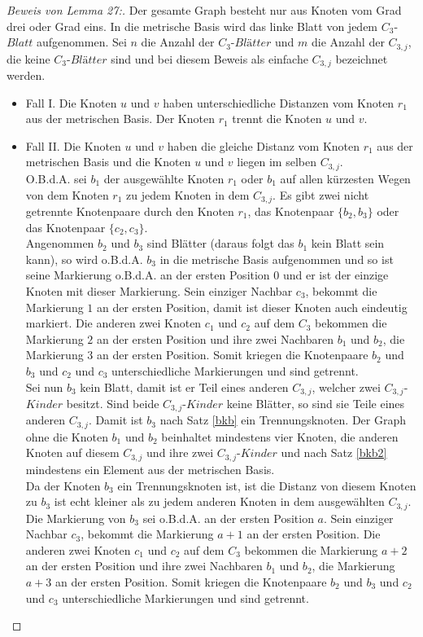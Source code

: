 \begin{proof}[Beweis von Lemma 27:]
Der gesamte Graph besteht nur aus Knoten vom Grad drei oder Grad eins. In die metrische Basis wird das linke Blatt von jedem $C_{3}$-$Blatt$ aufgenommen. Sei $n$ die Anzahl der $C_{3}$-$Blätter$ und $m$ die Anzahl der $C_{3,j}$, die keine $C_{3}$-$Blätter$ sind und bei diesem Beweis als einfache $C_{3,j}$ bezeichnet werden.
\begin{itemize}
\item Fall I. Die Knoten $u$ und $v$ haben unterschiedliche Distanzen vom Knoten $r_1$ aus der metrischen Basis. Der Knoten $r_1$ trennt die Knoten $u$ und $v$.
\item Fall II. Die Knoten $u$ und $v$ haben die gleiche Distanz vom Knoten $r_1$ aus der metrischen Basis und die Knoten $u$ und $v$ liegen im selben $C_{3,j}$.\\
O.B.d.A. sei $b_1$ der ausgewählte Knoten $r_1$ oder $b_1$ auf allen kürzesten Wegen von dem Knoten $r_1$ zu jedem Knoten in dem $C_{3,j}$. Es gibt zwei nicht getrennte Knotenpaare durch den Knoten $r_1$, das Knotenpaar $\{b_2,b_3\}$ oder das Knotenpaar $\{c_2,c_3\}$.\\
Angenommen $b_2$ und $b_3$ sind Blätter (daraus folgt das $b_1$ kein Blatt sein kann), so wird o.B.d.A. $b_3$ in die metrische Basis aufgenommen und so ist seine Markierung o.B.d.A. an der ersten Position $0$ und er ist der einzige Knoten mit dieser Markierung. Sein einziger Nachbar $c_3$, bekommt die Markierung $1$ an der ersten Position, damit ist dieser Knoten auch eindeutig markiert. Die anderen zwei Knoten $c_1$ und $c_2$ auf dem $C_3$ bekommen die Markierung $2$ an der ersten Position und ihre zwei Nachbaren $b_1$ und $b_2$, die Markierung $3$ an der ersten Position. Somit kriegen die Knotenpaare $b_2$ und $b_3$ und $c_2$ und $c_3$ unterschiedliche Markierungen und sind getrennt.\\ 	 
Sei nun $b_3$ kein Blatt, damit ist er Teil eines anderen $C_{3,j}$, welcher zwei $C_{3,j}$-$Kinder$ besitzt. Sind beide $C_{3,j}$-$Kinder$ keine Blätter, so sind sie Teile eines anderen $C_{3,j}$. Damit ist $b_3$ nach Satz \ref{bkb} ein Trennungsknoten. Der Graph ohne die Knoten $b_1$ und $b_2$ beinhaltet mindestens vier Knoten, die anderen Knoten auf diesem $C_{3,j}$ und ihre zwei $C_{3,j}$-$Kinder$ und nach Satz \ref{bkb2} mindestens ein Element aus der metrischen Basis.\\
Da der Knoten $b_3$ ein Trennungsknoten ist, ist die Distanz von diesem Knoten zu $b_3$ ist echt kleiner als zu jedem anderen Knoten in dem ausgewählten $C_{3,j}$. Die Markierung von $b_3$ sei o.B.d.A. an der ersten Position $a$. Sein einziger Nachbar $c_3$, bekommt die Markierung $a+1$ an der ersten Position. Die anderen zwei Knoten $c_1$ und $c_2$ auf dem $C_3$ bekommen die Markierung $a+2$ an der ersten Position und ihre zwei Nachbaren $b_1$ und $b_2$, die Markierung $a+3$ an der ersten Position. Somit kriegen die Knotenpaare $b_2$ und $b_3$ und $c_2$ und $c_3$ unterschiedliche Markierungen und sind getrennt.

\end{itemize}
\end{proof}
